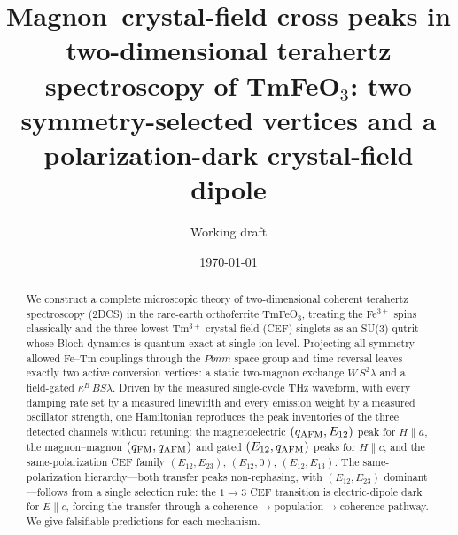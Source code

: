 \documentclass[aps,prl,twocolumn,superscriptaddress,longbibliography]{revtex4-2}
\newcommand{\qafm}{q_{\rm AFM}}
\newcommand{\qfm}{q_{\rm FM}}
\begin{document}
\title{Magnon--crystal-field cross peaks in two-dimensional terahertz
spectroscopy of TmFeO$_3$: two symmetry-selected vertices and a
polarization-dark crystal-field dipole}

\author{Working draft}
\affiliation{---}

\date{\today}

\begin{abstract}
We construct a complete microscopic theory of two-dimensional coherent
terahertz spectroscopy (2DCS) in the rare-earth orthoferrite TmFeO$_3$,
treating the Fe$^{3+}$ spins classically and the three lowest Tm$^{3+}$
crystal-field (CEF) singlets as an SU(3) qutrit whose Bloch dynamics is
quantum-exact at single-ion level.  Projecting all symmetry-allowed
Fe--Tm couplings through the $Pbnm$ space group and time reversal leaves
exactly two active conversion vertices: a static two-magnon exchange
$W\,S^2\lambda$ and a field-gated $\kappa^B\,B S\lambda$.  Driven by the
measured single-cycle THz waveform, with every damping rate set by a
measured linewidth and every emission weight by a measured oscillator
strength, one Hamiltonian reproduces the peak inventories of the three
detected channels without retuning: the magnetoelectric
$(\qafm,E_{12})$ peak for $H\!\parallel\!a$, the magnon--magnon
$(\qfm,\qafm)$ and gated $(E_{12},\qafm)$ peaks for $H\!\parallel\!c$,
and the same-polarization CEF family $(E_{12},E_{23})$, $(E_{12},0)$,
$(E_{12},E_{13})$.  The same-polarization hierarchy---both transfer
peaks non-rephasing, with $(E_{12},E_{23})$ dominant---follows from a
single selection rule: the $1\!\to\!3$ CEF transition is electric-dipole
dark for $E\!\parallel\!c$, forcing the transfer through a
coherence$\to$population$\to$coherence pathway.  We give falsifiable
predictions for each mechanism.
\end{abstract}

\maketitle
\end{document}
